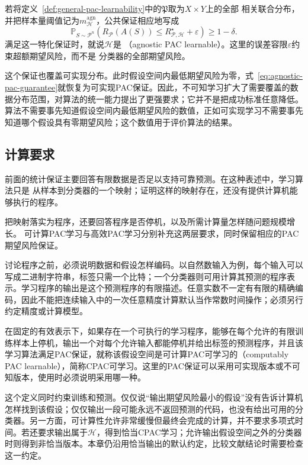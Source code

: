 若将定义~\ref{def:general-pac-learnability}中的$\mathfrak P$取为$X\times Y$上的全部
相关联合分布，并把样本量阈值记为$m_{\mathcal H}^{\mathrm{agn}}$，公共保证相应地写成
\begin{equation}
 \mathbb P_{S\sim\mathcal P^n}\left(
 R_{\mathcal P}(A(S))\leq R_{\mathcal P,\mathcal H}^\star+\varepsilon
 \right)\geq1-\delta.
 \label{eq:agnostic-pac-guarantee}
\end{equation}
满足这一特化保证时，就说$\mathcal H$是
（agnostic PAC learnable）。这里的误差容限$\varepsilon$约束超额期望风险，而不是
分类器的全部期望风险。

这个保证也覆盖可实现分布。此时假设空间内最低期望风险为零，式~\eqref{eq:agnostic-pac-guarantee}就恢复为可实现PAC保证。因此，不可知学习扩大了需要覆盖的数据分布范围，对算法的统一能力提出了更强要求；它并不是把成功标准任意降低。算法不需要事先知道假设空间内最低期望风险的数值，正如可实现学习不需要事先知道哪个假设具有零期望风险；这个数值用于评价算法的结果。

\subsection{计算要求}
\label{sec:pac-computation-requirements}

前面的统计保证主要回答有限数据是否足以支持可靠预测。在这种表述中，学习算法只是
从样本到分类器的一个映射；证明这样的映射存在，还没有提供计算机能够执行的程序。

把映射落实为程序，还要回答程序是否停机，以及所需计算量怎样随问题规模增长。
可计算PAC学习与高效PAC学习分别补充这两层要求，同时保留相应的PAC期望风险保证。

讨论程序之前，必须说明数据和假设怎样编码。以自然数输入为例，每个输入可以写成二进制字符串，标签只需一个比特；一个分类器则可用计算其预测的程序表示。学习程序的输出是这个预测程序的有限描述。任意实数不一定有有限的精确编码，因此不能把连续输入中的一次任意精度计算默认当作常数时间操作；必须另行约定精度或计算模型。

\begin{definition}[可计算PAC学习]
\label{def:computable-pac-learning}
在固定的有效表示下，如果存在一个可执行的学习程序，能够在每个允许的有限训练样本上停机，输出一个对每个允许输入都能停机并给出标签的预测程序，并且该学习算法满足PAC保证，就称该假设空间是可计算PAC可学习的（computably PAC learnable），简称CPAC可学习。这里的PAC保证可以采用可实现版本或不可知版本，使用时必须说明采用哪一种。
\end{definition}

这个定义同时约束训练和预测。仅仅说“输出期望风险最小的假设”没有告诉计算机怎样找到该假设；仅仅输出一段可能永远不返回预测的代码，也没有给出可用的分类器。另一方面，可计算性允许非常缓慢但最终会完成的计算，并不要求多项式时间。若还要求输出属于$\mathcal H$，得到恰当CPAC学习；允许输出假设空间之外的分类器时则得到非恰当版本。本章仍沿用恰当输出的默认约定，比较文献结论时需要检查这一约定。

